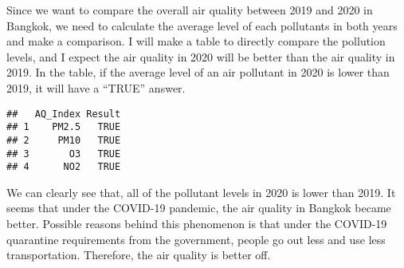 \documentclass[
]{article}
\newenvironment{Shaded}{\begin{snugshade}}{\end{snugshade}}
\newcommand{\AttributeTok}[1]{\textcolor[rgb]{0.77,0.63,0.00}{#1}}
\newcommand{\FunctionTok}[1]{\textcolor[rgb]{0.00,0.00,0.00}{#1}}
\newcommand{\NormalTok}[1]{#1}
\newcommand{\OtherTok}[1]{\textcolor[rgb]{0.56,0.35,0.01}{#1}}
\newcommand{\SpecialCharTok}[1]{\textcolor[rgb]{0.00,0.00,0.00}{#1}}
\newcommand{\StringTok}[1]{\textcolor[rgb]{0.31,0.60,0.02}{#1}}
\begin{document}
Since we want to compare the overall air quality between 2019 and 2020
in Bangkok, we need to calculate the average level of each pollutants in
both years and make a comparison. I will make a table to directly
compare the pollution levels, and I expect the air quality in 2020 will
be better than the air quality in 2019. In the table, if the average
level of an air pollutant in 2020 is lower than 2019, it will have a
``TRUE'' answer.

\begin{Shaded}
\end{Shaded}

\begin{verbatim}
##   AQ_Index Result
## 1    PM2.5   TRUE
## 2     PM10   TRUE
## 3       O3   TRUE
## 4      NO2   TRUE
\end{verbatim}

We can clearly see that, all of the pollutant levels in 2020 is lower
than 2019. It seems that under the COVID-19 pandemic, the air quality in
Bangkok became better. Possible reasons behind this phenomenon is that
under the COVID-19 quarantine requirements from the government, people
go out less and use less transportation. Therefore, the air quality is
better off.
\end{document}

